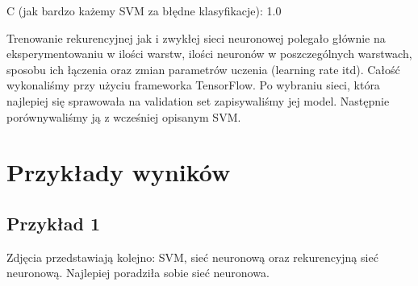 \documentclass[titlepage,10pt,a4paper]{article}
\begin{document}
C (jak bardzo każemy SVM za błędne klasyfikacje): 1.0


Trenowanie rekurencyjnej jak i zwykłej sieci neuronowej polegało głównie na eksperymentowaniu w ilości warstw, ilości neuronów w poszczególnych warstwach, sposobu ich łączenia oraz zmian parametrów uczenia (learning rate itd).
Całość wykonaliśmy przy użyciu frameworka TensorFlow. Po wybraniu sieci, która najlepiej się sprawowała na validation set zapisywaliśmy jej model. Następnie porównywaliśmy ją z wcześniej opisanym SVM.


\section {Przykłady wyników}
\subsection{Przykład 1}
Zdjęcia przedstawiają kolejno: SVM, sieć neuronową oraz rekurencyjną sieć neuronową. Najlepiej poradziła sobie sieć neuronowa.
\pagebreak
\end{document}
